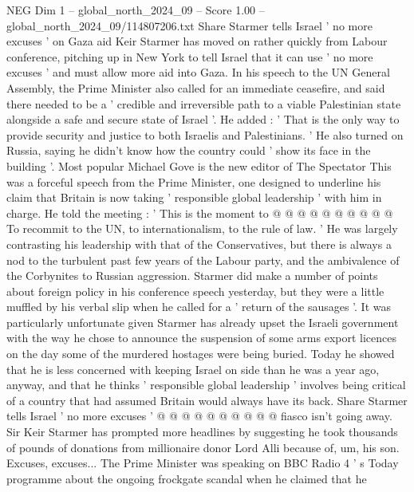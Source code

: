 \begin{textsample}{NEG Dim 1 – global\_north\_2024\_09 – Score 1.00 – global\_north\_2024\_09/114807206.txt}  \label{ex:f1_neg_022}
Share Starmer tells Israel ' no more excuses ' on Gaza aid Keir Starmer has moved on rather quickly from Labour conference, pitching up in New York to tell Israel that it can use ' no more excuses ' and must allow more aid into Gaza.
In his speech to the UN General Assembly, the Prime Minister also called for an immediate ceasefire, and said there needed to be a ' credible and irreversible path to a viable Palestinian state alongside a safe and secure state of Israel '.
He added : ' That is the only way to provide security and justice to both Israelis and Palestinians. ' He also turned on Russia, saying he didn't know how the country could ' show its face in the building '.
Most popular Michael Gove is the new editor of The Spectator This was a forceful speech from the Prime Minister, one designed to underline his claim that Britain is now taking ' responsible global leadership ' with him in charge.
He told the meeting : ' This is the moment to @ @ @ @ @ @ @ @ @ @ To recommit to the UN, to internationalism, to the rule of law. ' He was largely contrasting his leadership with that of the Conservatives, but there is always a nod to the turbulent past few years of the Labour party, and the ambivalence of the Corbynites to Russian aggression.
Starmer did make a number of points about foreign policy in his conference speech yesterday, but they were a little muffled by his verbal slip when he called for a ' return of the sausages '.
It was particularly unfortunate given Starmer has already upset the Israeli government with the way he chose to announce the suspension of some arms export licences on the day some of the murdered hostages were being buried.
Today he showed that he is less concerned with keeping Israel on side than he was a year ago, anyway, and that he thinks ' responsible global leadership ' involves being critical of a country that had assumed Britain would always have its back.
Share Starmer tells Israel ' no more excuses ' @ @ @ @ @ @ @ @ @ @ fiasco isn't going away.
Sir Keir Starmer has prompted more headlines by suggesting he took thousands of pounds of donations from millionaire donor Lord Alli because of, um, his son.
Excuses, excuses...
The Prime Minister was speaking on BBC Radio 4 ' s Today programme about the ongoing frockgate scandal when he claimed that he

\end{textsample}
